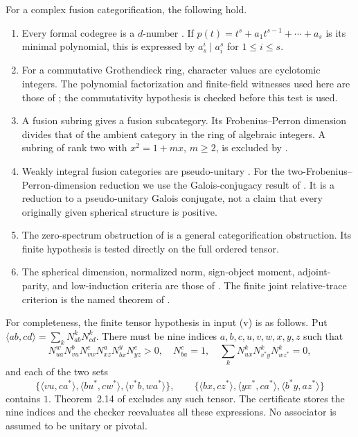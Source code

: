 \begin{proposition}\label{prop:inputs}
For a complex fusion categorification, the following hold.
\begin{enumerate}[label=(\roman*)]
\item Every formal codegree is a $d$-number \cite{Ocode}. If
$p(t)=t^s+a_1t^{s-1}+\cdots+a_s$ is its minimal polynomial, this is
expressed by $a_s^i\mid a_i^s$ for $1\le i\le s$.
\item For a commutative Grothendieck ring, character values are cyclotomic
integers. The polynomial factorization and finite-field witnesses used
here are those of \cite[Section~2]{DP4}; the commutativity hypothesis is
checked before this test is used.
\item A fusion subring gives a fusion subcategory. Its Frobenius--Perron
dimension divides that of the ambient category in the ring of algebraic
integers. A subring of rank two with $x^2=1+mx$, $m\ge2$, is excluded
by \cite{Ostrik2}.
\item Weakly integral fusion categories are pseudo-unitary
\cite{ENO}. For the two-Frobenius--Perron-dimension reduction we use the
Galois-conjugacy result of \cite[Lemma~3.1]{SchTwo}.
It is a reduction to a pseudo-unitary Galois conjugate, not a claim that
every originally given spherical structure is positive.
\item The zero-spectrum obstruction of \cite[Theorem~2.14]{LPR}
is a general categorification obstruction. Its finite hypothesis is
tested directly on the full ordered tensor.
\item The spherical dimension, normalized norm, sign-object moment,
adjoint-parity, and low-induction criteria are those of
\cite[Sections~2,3,6,7]{DP4}. The finite joint relative-trace criterion is the named theorem of
\cite{DP5}.
\end{enumerate}
\end{proposition}

For completeness, the finite tensor hypothesis in input (v) is as
follows. Put $\langle ab,cd\rangle=\sum_kN_{ab}^kN_{cd}^k$.
There must be nine indices $a,b,c,u,v,w,x,y,z$ such that
\[
 N_{ua}^{w}N_{vu}^{b}N_{vw}^{c}N_{xz}^{a}N_{bx}^{y}N_{yz}^{c}>0,
 \quad N_{ba}^{c}=1,
 \quad \sum_kN_{ux}^{k}N_{v^*y}^{k}N_{wz^*}^{k}=0,
\]
and each of the two sets
\[
 \{\langle vu,ca^*\rangle,\langle bu^*,cw^*\rangle,
       \langle v^*b,wa^*\rangle\},
 \qquad
 \{\langle bx,cz^*\rangle,\langle yx^*,ca^*\rangle,
       \langle b^*y,az^*\rangle\}
\]
contains $1$. Theorem~2.14 of \cite{LPR} excludes any such tensor.
The certificate stores the nine indices and the checker reevaluates all
these expressions. No associator is assumed to be unitary or pivotal.

